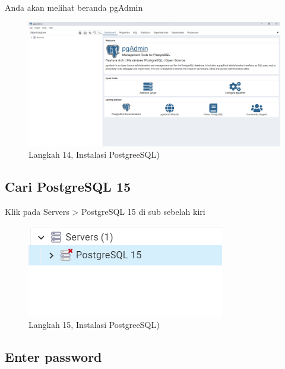 \documentclass[
]{book}
\begin{document}
Anda akan melihat beranda pgAdmin

\begin{figure}

{\centering \includegraphics[width=1\linewidth]{./images/Bab1/Postgree13} 

}

\caption{Langkah 14, Instalasi PostgreeSQL)}\label{fig:install-posrgree14}
\end{figure}

\hypertarget{cari-postgresql-15}{%
\subsection{Cari PostgreSQL 15}\label{cari-postgresql-15}}

Klik pada Servers \textgreater{} PostgreSQL 15 di sub sebelah kiri

\begin{figure}

{\centering \includegraphics[width=1\linewidth]{./images/Bab1/Postgree14} 

}

\caption{Langkah 15, Instalasi PostgreeSQL)}\label{fig:install-posrgree15}
\end{figure}

\hypertarget{enter-password}{%
\subsection{Enter password}\label{enter-password}}
\end{document}
